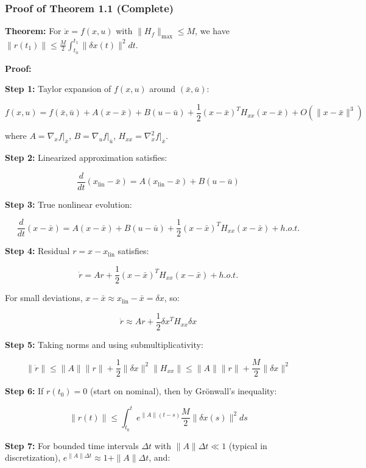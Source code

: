 \documentclass[
  letterpaper,
  DIV=11,
  numbers=noendperiod]{scrartcl}
\begin{document}
\subsubsection{Proof of Theorem 1.1
(Complete)}\label{proof-of-theorem-1.1-complete}

\textbf{Theorem:} For \(\dot{x} = f(x,u)\) with
\(\|H_f\|_{\max} \leq M\), we have
\(\|r(t_1)\| \leq \frac{M}{2} \int_{t_0}^{t_1} \|\delta x(t)\|^2 dt\).

\textbf{Proof:}

\textbf{Step 1:} Taylor expansion of \(f(x,u)\) around
\((\bar{x}, \bar{u})\):

\[
f(x,u) = f(\bar{x}, \bar{u}) + A(x - \bar{x}) + B(u - \bar{u}) + \frac{1}{2}(x-\bar{x})^T H_{xx} (x-\bar{x}) + O(\|x-\bar{x}\|^3)
\]

where \(A = \nabla_x f|_{\bar{x}}\), \(B = \nabla_u f|_{\bar{u}}\),
\(H_{xx} = \nabla_x^2 f|_{\bar{x}}\).

\textbf{Step 2:} Linearized approximation satisfies:

\[
\frac{d}{dt}(x_{\text{lin}} - \bar{x}) = A(x_{\text{lin}} - \bar{x}) + B(u - \bar{u})
\]

\textbf{Step 3:} True nonlinear evolution:

\[
\frac{d}{dt}(x - \bar{x}) = A(x - \bar{x}) + B(u - \bar{u}) + \frac{1}{2}(x-\bar{x})^T H_{xx} (x-\bar{x}) + h.o.t.
\]

\textbf{Step 4:} Residual \(r = x - x_{\text{lin}}\) satisfies:

\[
\dot{r} = A r + \frac{1}{2} (x - \bar{x})^T H_{xx} (x - \bar{x}) + h.o.t.
\]

For small deviations,
\(x - \bar{x} \approx x_{\text{lin}} - \bar{x} = \delta x\), so:

\[
\dot{r} \approx A r + \frac{1}{2} \delta x^T H_{xx} \delta x
\]

\textbf{Step 5:} Taking norms and using submultiplicativity:

\[
\|\dot{r}\| \leq \|A\| \|r\| + \frac{1}{2} \|\delta x\|^2 \|H_{xx}\| \leq \|A\| \|r\| + \frac{M}{2} \|\delta x\|^2
\]

\textbf{Step 6:} If \(r(t_0) = 0\) (start on nominal), then by
Grönwall's inequality:

\[
\|r(t)\| \leq \int_{t_0}^{t} e^{\|A\|(t-s)} \frac{M}{2} \|\delta x(s)\|^2 ds
\]

\textbf{Step 7:} For bounded time intervals \(\Delta t\) with
\(\|A\| \Delta t \ll 1\) (typical in discretization),
\(e^{\|A\| \Delta t} \approx 1 + \|A\| \Delta t\), and:
\end{document}
